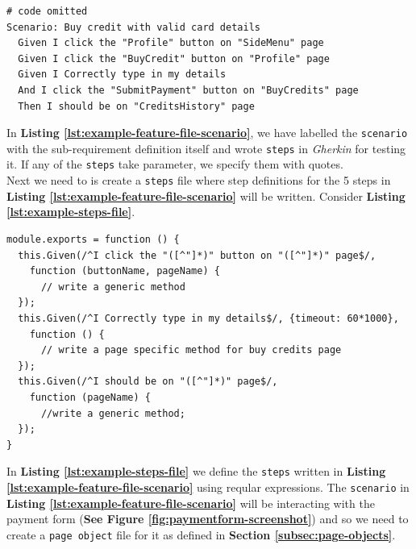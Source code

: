 \begin{listing}[H]
\begin{verbatim}
# code omitted
Scenario: Buy credit with valid card details
  Given I click the "Profile" button on "SideMenu" page
  Given I click the "BuyCredit" button on "Profile" page
  Given I Correctly type in my details
  And I click the "SubmitPayment" button on "BuyCredits" page
  Then I should be on "CreditsHistory" page
\end{verbatim}
\label{lst:example-feature-file-scenario}
\end{listing}

In \textbf{Listing \ref{lst:example-feature-file-scenario}}, we have labelled the \texttt{scenario} with the sub-requirement definition itself and wrote \texttt{steps} in \textit{Gherkin} for testing it. If any of the \texttt{steps} take parameter, we specify them with quotes.\\

Next we need to is create a \texttt{steps} file where step definitions for the 5 steps in \textbf{Listing \ref{lst:example-feature-file-scenario}} will be written. Consider \textbf{Listing \ref{lst:example-steps-file}}.

\begin{listing}[H]
\begin{verbatim}
module.exports = function () {
  this.Given(/^I click the "([^"]*)" button on "([^"]*)" page$/,
    function (buttonName, pageName) {
      // write a generic method
  });
  this.Given(/^I Correctly type in my details$/, {timeout: 60*1000},
    function () {
      // write a page specific method for buy credits page
  });
  this.Given(/^I should be on "([^"]*)" page$/,
    function (pageName) {
      //write a generic method;
  });
}
\end{verbatim}
\label{lst:example-steps-file}
\end{listing}

In \textbf{Listing \ref{lst:example-steps-file}} we define the \texttt{steps} written in \textbf{Listing \ref{lst:example-feature-file-scenario}} using reqular expressions. The \texttt{scenario} in \textbf{Listing \ref{lst:example-feature-file-scenario}} will be interacting with the payment form (\textbf{See Figure \ref{fig:paymentform-screenshot}}) and so we need to create a \texttt{page object} file for it as defined in  \textbf{Section \ref{subsec:page-objects}}.


